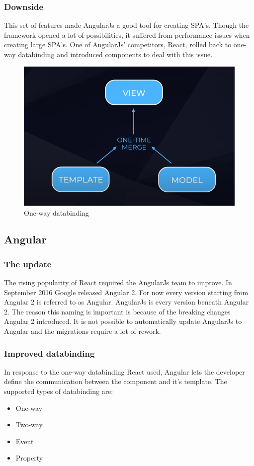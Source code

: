 \subsubsection{Downside}
This set of features made AngularJs a good tool for creating SPA's. Though the framework opened a lot of possibilities, it suffered from performance issues when creating large SPA's. One of AngularJs' competitors, React, rolled back to one-way databinding and introduced components to deal with this issue. \autocite{AltexSoft}
\begin{figure}[h!]
    \caption{One-way databinding}
    \centering
    \includegraphics[width=\textwidth]{img/onewaydata.png} 
\end{figure}

\subsection{Angular}
\subsubsection{The update}
The rising popularity of React required the AngularJs team to improve. In September 2016 Google released Angular 2. For now every version starting from Angular 2 is referred to as Angular. AngularJs is every version beneath Angular 2. The reason this naming is important is because of the breaking changes Angular 2 introduced. It is not possible to automatically update AngularJs to Angular and the migrations require a lot of rework.
\autocite{Semenas2020}

\subsubsection{Improved databinding}
In response to the one-way databinding React used, Angular lets the developer define the communication between the component and it's template. The supported types of databinding are:
\begin{itemize}
    \item One-way
    \item Two-way
    \item Event
    \item Property
\end{itemize}
\autocite{AltexSoft}
